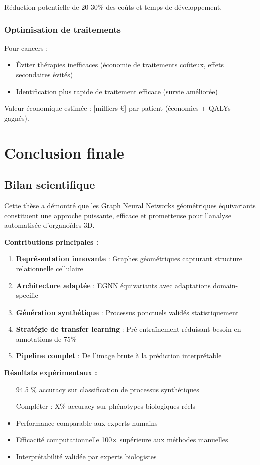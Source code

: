 Réduction potentielle de 20-30\% des coûts et temps de développement.

\subsubsection{Optimisation de traitements}

Pour cancers :
\begin{itemize}
    \item Éviter thérapies inefficaces (économie de traitements coûteux, effets secondaires évités)
    \item Identification plus rapide de traitement efficace (survie améliorée)
\end{itemize}

Valeur économique estimée : [milliers €] par patient (économies + QALYs gagnés).

\section{Conclusion finale}

\subsection{Bilan scientifique}

Cette thèse a démontré que les Graph Neural Networks géométriques équivariants constituent une approche puissante, efficace et prometteuse pour l'analyse automatisée d'organoïdes 3D.

\textbf{Contributions principales :}
\begin{enumerate}
    \item \textbf{Représentation innovante} : Graphes géométriques capturant structure relationnelle cellulaire
    \item \textbf{Architecture adaptée} : EGNN équivariants avec adaptations domain-specific
    \item \textbf{Génération synthétique} : Processus ponctuels validés statistiquement
    \item \textbf{Stratégie de transfer learning} : Pré-entraînement réduisant besoin en annotations de 75\%
    \item \textbf{Pipeline complet} : De l'image brute à la prédiction interprétable
\end{enumerate}

\textbf{Résultats expérimentaux :}
\begin{itemize}
    \item [94.5]\% accuracy sur classification de processus synthétiques
    \item [Compléter : X\%] accuracy sur phénotypes biologiques réels
    \item Performance comparable aux experts humains
    \item Efficacité computationnelle 100× supérieure aux méthodes manuelles
    \item Interprétabilité validée par experts biologistes
\end{itemize}

